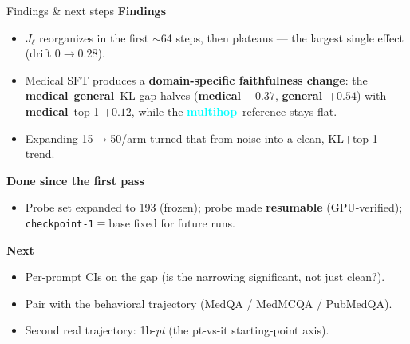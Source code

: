 \documentclass[aspectratio=169,11pt]{beamer}
\newcommand{\gen}{\textcolor{genblue}{\textbf{general}}}
\newcommand{\med}{\textcolor{medorange}{\textbf{medical}}}
\newcommand{\mh}{\textcolor{aqua}{\textbf{multihop}}}
\begin{document}
\begin{frame}{Findings \& next steps}
  \textbf{Findings}
  \begin{itemize}\setlength\itemsep{0.15em}
    \item $J_\ell$ reorganizes in the first $\sim$64 steps, then plateaus ---
          the largest single effect (drift $0\!\to\!0.28$).
    \item Medical SFT produces a \textbf{domain-specific faithfulness change}:
          the \med--\gen\ KL gap halves (\med\ $-0.37$, \gen\ $+0.54$) with \med\
          top-1 $+0.12$, while the \mh\ reference stays flat.
    \item Expanding 15$\to$50/arm turned that from noise into a clean,
          KL$+$top-1 trend.
  \end{itemize}
  \vspace{0.2em}
  \textbf{Done since the first pass}
  \begin{itemize}\setlength\itemsep{0.15em}
    \item Probe set expanded to 193 (frozen); probe made \textbf{resumable}
          (GPU-verified); \texttt{checkpoint-1}$\equiv$base fixed for future runs.
  \end{itemize}
  \vspace{0.2em}
  \textbf{Next}
  \begin{itemize}\setlength\itemsep{0.15em}
    \item Per-prompt CIs on the gap (is the narrowing significant, not just clean?).
    \item Pair with the behavioral trajectory (MedQA / MedMCQA / PubMedQA).
    \item Second real trajectory: 1b-\emph{pt} (the pt-vs-it starting-point axis).
  \end{itemize}
\end{frame}
\end{document}
